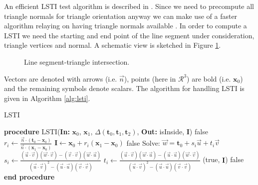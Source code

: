 \documentclass{JAC2003}
\begin{document}
An efficient LSTI test algorithm is described in \cite{FA}. Since we need to
precompute all triangle normals for triangle orientation anyway we can make use
of a faster algorithm relaying on having triangle normals available \cite{LT}.
In order to compute a LSTI we need the starting and end point of the
line segment under consideration, triangle vertices and normal. A schematic view
is sketched in Figure \ref{fig:L-T}.
%
\begin{figure}
\begin{center}

\end{center}
\caption{Line segment-triangle intersection.\label{fig:L-T}}
\end{figure}
%
Vectors are denoted with arrows (i.e. $\vec{n}$), points (here in
$\mathcal{R}^3$) are bold (i.e. $\mathbf{x}_0$) and the remaining symbols denote
scalars. The algorithm for handling LSTI is given in Algorithm \ref{alg:lsti}.
%
\begin{algorithm}
  \caption{LSTI} \label{alg:lsti}
   \begin{algorithmic}[1]
     \STATE \textbf{procedure} LSTI(\textbf{In:} $\mathbf{x}_0$, $\mathbf{x}_1$, $\Delta(\mathbf{t}_0, \mathbf{t}_1, \mathbf{t}_2)$, \textbf{Out:} isInside, $\mathbf{I}$)
     \RETURN false 
     \ELSE
     \STATE $ r_i \leftarrow \frac{\vec{n} \cdot (\mathbf{t}_0-\mathbf{x}_0)}{ \vec{n}\cdot(\mathbf{x}_1-\mathbf{x}_0)} $
     \STATE $\mathbf{I} \leftarrow \mathbf{x}_0+r_i(\mathbf{x}_1-\mathbf{x}_0) $ 
        \RETURN false 
     \ELSE 
        \STATE {}
        \STATE Solve: $\vec{w}=\mathbf{t}_0+s_i\vec{u}+t_i\vec{v}$ 
        \STATE $s_i \leftarrow \frac{(\vec{u} \cdot \vec{v})(\vec{w} \cdot \vec{v})-(\vec{v} \cdot \vec{v})(\vec{w} \cdot \vec{u})}{(\vec{u} \cdot \vec{v})^2-(\vec{u} \cdot \vec{u})(\vec{v} \cdot \vec{v})}$
        \STATE $t_i \leftarrow \frac{(\vec{u} \cdot \vec{v})(\vec{w} \cdot \vec{u})-(\vec{u} \cdot \vec{u})(\vec{w} \cdot \vec{v})}{(\vec{u} \cdot \vec{v})^2-(\vec{u} \cdot \vec{u})(\vec{v} \cdot \vec{v})}$
            \RETURN (true, $\mathbf{I}$)
        \ELSE
            \RETURN false 
        \ENDIF
     \ENDIF
\ENDIF
       \STATE \textbf{end procedure}
   \end{algorithmic}
 \end{algorithm}
\end{document}
